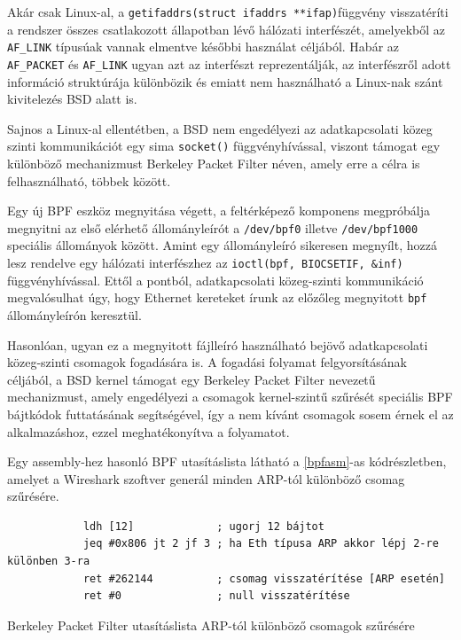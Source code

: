 \documentclass[a4paper,12pt]{article}
\begin{document}
	Akár csak Linux-al, a \texttt{getifaddrs(struct ifaddrs **ifap)}függvény visszatéríti a rendszer összes csatlakozott állapotban lévő hálózati interfészét, amelyekből az \texttt{AF_LINK} típusúak vannak elmentve későbbi használat céljából. Habár az \texttt{AF_PACKET} és \texttt{AF_LINK} ugyan azt az interfészt reprezentálják, az interfészről adott információ struktúrája különbözik és emiatt nem használható a Linux-nak szánt kivitelezés BSD alatt is.
	
	Sajnos a Linux-al ellentétben, a BSD nem engedélyezi az adatkapcsolati közeg szinti kommunikációt egy sima  \texttt{socket()} függvényhívással, viszont támogat egy különböző mechanizmust Berkeley Packet Filter néven, amely erre a célra is felhasználható, többek között.
	
	Egy új BPF eszköz megnyitása végett, a feltérképező komponens megpróbálja megnyitni az első elérhető állományleírót a \texttt{/dev/bpf0} illetve \texttt{/dev/bpf1000} speciális állományok között. Amint egy állományleíró sikeresen megnyílt, hozzá lesz rendelve egy hálózati interfészhez az \texttt{ioctl(bpf, BIOCSETIF, &inf)} függvényhívással. Ettől a pontból, adatkapcsolati közeg-szinti kommunikáció megvalósulhat úgy, hogy Ethernet kereteket írunk az előzőleg megnyitott \texttt{bpf} állományleírón keresztül.
	
	Hasonlóan, ugyan ez a megnyitott fájlleíró használható bejövő adatkapcsolati közeg-szinti csomagok fogadására is. A fogadási folyamat felgyorsításának céljából, a BSD kernel támogat egy Berkeley Packet Filter nevezetű mechanizmust, amely engedélyezi a csomagok kernel-szintű szűrését speciális BPF bájtkódok futtatásának segítségével, így a nem kívánt csomagok sosem érnek el az alkalmazáshoz, ezzel meghatékonyítva a folyamatot.
	
	Egy assembly-hez hasonló BPF utasításlista látható a \ref{bpfasm}-as kódrészletben, amelyet a Wireshark szoftver generál minden ARP-tól különböző csomag szűrésére.
	
	\begin{listing}[H]
		\begin{verbatim}
			ldh [12]             ; ugorj 12 bájtot
			jeq #0x806 jt 2 jf 3 ; ha Eth típusa ARP akkor lépj 2-re különben 3-ra
			ret #262144          ; csomag visszatérítése [ARP esetén]
			ret #0               ; null visszatérítése
		\end{verbatim}
		\caption{Berkeley Packet Filter utasításlista ARP-tól különböző csomagok szűrésére}
		\label{bpfasm}
	\end{listing}
	
\end{document}
